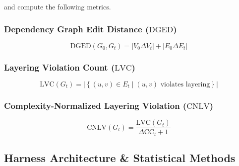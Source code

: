 \documentclass[11pt]{article}
\newcommand{\DGED}{\mathrm{DGED}}
\newcommand{\LVC}{\mathrm{LVC}}
\newcommand{\CNLV}{\mathrm{CNLV}}
\newcommand{\CC}{\mathrm{CC}}
\begin{document}
and compute the following metrics.


\subsubsection{Dependency Graph Edit Distance ($\DGED$)}

\begin{equation}
    \boxed{
    \DGED(G_0,G_t)
    =
    |V_0\Delta V_t|
    +
    |E_0\Delta E_t|
    }
    \label{eq:dged}
\end{equation}


\subsubsection{Layering Violation Count ($\LVC$)}

\begin{equation}
    \boxed{
    \LVC(G_t)
    =
    \left|
    \left\{
        (u,v)\in E_t
        \mid
        (u,v)
        \text{ violates layering}
    \right\}
    \right|
    }
    \label{eq:lvc}
\end{equation}


\subsubsection{Complexity-Normalized Layering Violation ($\CNLV$)}

\begin{equation}
    \boxed{
    \CNLV(G_t)
    =
    \frac{\LVC(G_t)}
    {\Delta\CC_t+1}
    }
    \label{eq:cnlv}
\end{equation}


\subsection{Harness Architecture \& Statistical Methods}
\label{sec:harness}
\end{document}
